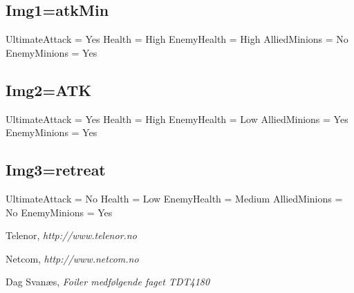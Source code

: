 \documentclass[titlepage]{article}
\begin{document}
\subsection*{Img1=atkMin}
UltimateAttack = Yes
Health = High
EnemyHealth = High
AlliedMinions = No
EnemyMinions = Yes

\subsection*{Img2=ATK}
UltimateAttack = Yes
Health = High
EnemyHealth = Low
AlliedMinions = Yes
EnemyMinions = Yes

\subsection*{Img3=retreat}
UltimateAttack = No
Health = Low
EnemyHealth = Medium
AlliedMinions = No
EnemyMinions = Yes

\begin{thebibliography}{9}

	Telenor,
	\emph{http://www.telenor.no}

	Netcom,
	\emph{http://www.netcom.no}

	Dag Svanæs,
	\emph{Foiler medfølgende faget TDT4180}
\end{thebibliography}
\end{document}
